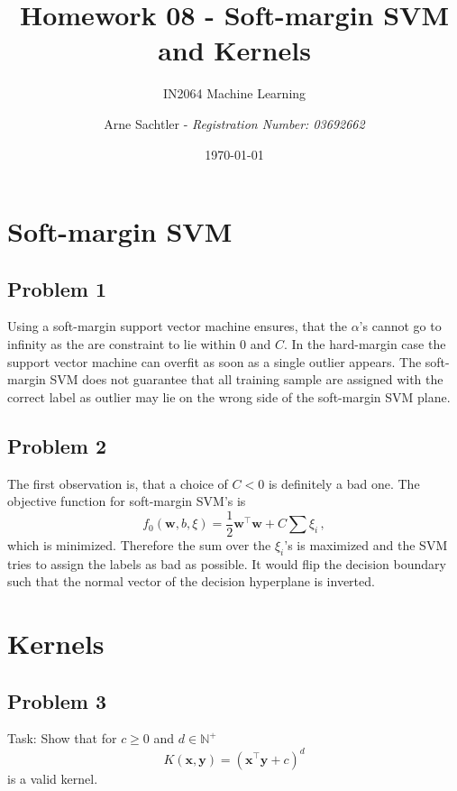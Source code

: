 \documentclass{scrartcl}
\title{Homework 08 - Soft-margin SVM and Kernels}
\author{Arne Sachtler - \textit{Registration Number: 03692662}}
\date{\today}
\subtitle{IN2064 Machine Learning}
\begin{document}
\maketitle

\section{Soft-margin SVM}
\subsection{Problem 1}
Using a soft-margin support vector machine ensures, that the $\alpha$'s cannot go to infinity as the are constraint to lie within $0$ and $C$. In the hard-margin case the support vector machine can overfit as soon as a single outlier appears. The soft-margin SVM does not guarantee that all training sample are assigned with the correct label as outlier may lie on the wrong side of the soft-margin SVM plane.

\subsection{Problem 2}
The first observation is, that a choice of $C < 0$ is definitely a bad one. The objective function for soft-margin SVM's is
\begin{equation}
	f_0(\mathbf{w},b,\xi) = \frac{1}{2}\mathbf{w}^\top \mathbf{w} + C \sum \xi_i \, ,
\end{equation}
which is minimized. Therefore the sum over the $\xi_i$'s is maximized and the SVM tries to assign the labels as bad as possible. It would flip the decision boundary such that the normal vector of the decision hyperplane is inverted.

\section{Kernels}
\subsection{Problem 3}
Task: Show that for $c \ge 0$ and $d \in \mathbb{N}^+$ 
\begin{equation}
	K(\mathbf{x}, \mathbf{y}) = (\mathbf{x}^\top \mathbf{y} + c)^d
\end{equation}
is a valid kernel.
\end{document}

